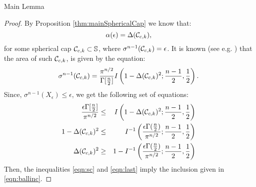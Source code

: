 \begin{subsection}{Main Lemma}
\begin{proof}By Proposition \ref{thm:mainSphericalCap} we know that:
\begin{equation}\label{eqn:sc}\alpha(\epsilon) = \Delta(\mathcal{C}_{c, k}),
\end{equation}
for some spherical cap $\mathcal{C}_{c,k} \subset \mathbb{S}$, where  $\sigma^{n-1}(\mathcal{C}_{c, k}) = \epsilon$. It is known (see e.g. \cite{sphericalCapRef}) that the area of such $\mathcal{C}_{c, k}$, is given by the equation:
\begin{equation}\sigma^{n-1}(\mathcal{C}_{c, k}) = \frac{\pi^{n/2}}{\Gamma[\frac{n}{2}]}I\left(1-\Delta(\mathcal{C}_{c,k})^2; \frac{n-1}{2}, \frac{1}{2}\right).
\end{equation}
Since, \mbox{$\sigma^{n-1}(X_\epsilon)\leq \epsilon$,} we get the following set of equations:
\begin{eqnarray}\nonumber \frac{\epsilon \Gamma[\frac{n}{2}]}{\pi^{n/2}} &\leq& I\left(1- \Delta(\mathcal{C}_{c,k})^2;\frac{n-1}{2}, \frac{1}{2}\right) \\
\nonumber 1- \Delta(\mathcal{C}_{c, k})^2 &\leq&  I^{-1}\left(\frac{\epsilon\Gamma(\frac{n}{2})}{\pi^{n/2}}; \frac{n-1}{2}, \frac{1}{2}\right) \\
\label{eqn:last}\Delta(\mathcal{C}_{c, k})^2 &\geq&  1- I^{-1}\left(\frac{\epsilon\Gamma(\frac{n}{2})}{\pi^{n/2}}; \frac{n-1}{2}, \frac{1}{2}\right)
\end{eqnarray}
Then, the inequalities \eqref{eqn:sc} and \eqref{eqn:last} imply the inclusion given in \eqref{eqn:ballinc}.%
\end{proof}
\end{subsection}



